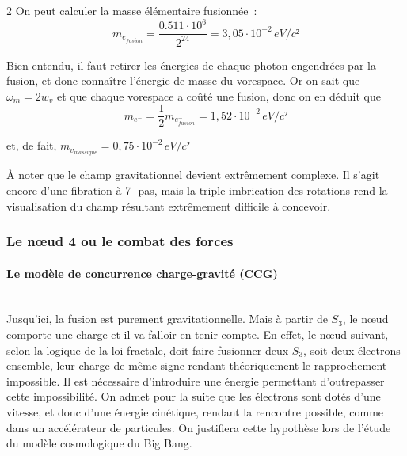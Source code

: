 \begin{multicols}{2}
On peut calculer la masse élémentaire fusionnée :
\begin{equation*}
m_{e^-_{fusion}} = \frac {0.511 \cdot 10^6} {2^{24}} = 3,05 \cdot 10^{-2}\,eV/c²
\end{equation*}

Bien entendu, il faut retirer les énergies de chaque
photon engendrées par la fusion, et donc connaître l'énergie de masse du
vorespace. Or on sait que $\omega_m = 2 w_v$ et que chaque vorespace a coûté
une fusion, donc on en déduit que
\begin{equation*}
m_{e^-} = \frac{1}{2} m_{e^-_{fusion}} = 1,52 \cdot 10^{-2}\,eV/c²
\end{equation*}

et, de fait, $m_{v_{massique}} = 0,75 \cdot 10^{-2}\,eV/c²$
\medskip

À noter que le champ gravitationnel devient extrêmement complexe. Il
s'agit encore d'une fibration à 7\,~pas, mais la triple imbrication des
rotations rend la visualisation du champ résultant extrêmement
difficile à concevoir.

\subsubsection{Le nœud 4 ou le combat des forces}

\paragraph{Le modèle de concurrence charge-gravité (CCG)}~\\

Jusqu'ici, la fusion est purement gravitationnelle. Mais à partir de
$S_3$, le nœud comporte une charge et il va falloir en tenir compte.
En effet, le nœud suivant, selon la logique de la loi fractale, doit
faire fusionner deux $S_3$, soit deux électrons ensemble, leur charge de même signe
rendant théoriquement le rapprochement impossible. Il est nécessaire
d'introduire une énergie permettant d'outrepasser cette
impossibilité. On admet pour la suite que les électrons sont dotés
d'une vitesse, et donc d'une énergie cinétique, rendant la rencontre
possible, comme dans un accélérateur de particules. On justifiera
cette hypothèse lors de l'étude du modèle cosmologique du Big Bang.


\end{multicols}
